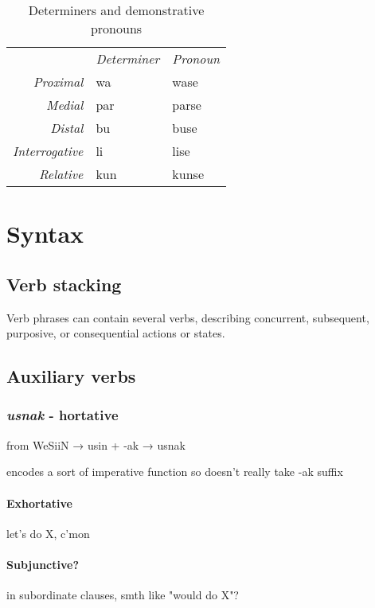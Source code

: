 \documentclass[a4paper,10pt,twoside,openright]{memoir}
\begin{document}
\begin{table}[ht]
    \centering
    \begin{tabular}{>{\em}rll}
        & \textit{Determiner} & \textit{Pronoun}  \\
    Proximal & wa & wase \\
    Medial & par & parse \\
    Distal & bu & buse \\
    Interrogative & li & lise \\
    Relative & kun & kunse 
    \end{tabular}
    \caption{Determiners and demonstrative pronouns}
    \label{tab:determiners}
\end{table}

\chapter{Syntax}

\section{Verb stacking}

Verb phrases can contain several verbs, describing concurrent, subsequent, purposive, or consequential actions or states.

\section{Auxiliary verbs}

\subsection{\emph{usnak} - hortative}

from WeSiiN → usin + -ak → usnak

encodes a sort of imperative function so doesn't really take -ak suffix

\subsubsection{Exhortative}

let's do X, c'mon

\subsubsection{Subjunctive?}

in subordinate clauses, smth like "would do X"?
\end{document}
